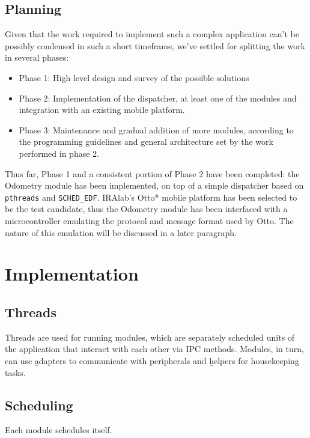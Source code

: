 \documentclass[a4paper,12pt]{report}
\begin{document}
\subsection{Planning}

Given that the work required to implement such a complex application can't be possibly condensed in such a short timeframe, we've settled for splitting the work in several phases:
\begin{itemize}
  \item Phase 1: High level design and survey of the possible solutions
  \item Phase 2: Implementation of the dispatcher, at least one of the modules and integration with an existing mobile platform.
  \item Phase 3: Maintenance and gradual addition of more modules, according to the programming guidelines and general architecture set by the work performed in phase 2.
\end{itemize}

Thus far, Phase 1 and a consistent portion of Phase 2 have been completed: the Odometry module has been implemented, on top of a simple dispatcher based on \texttt{pthreads} and \texttt{SCHED\_EDF}. IRAlab's Otto* mobile platform has been selected to be the test candidate, thus the Odometry module has been interfaced with a microcontroller emulating the protocol and message format used by Otto. The nature of this emulation will be discussed in a later paragraph. %

\section{Implementation}
\subsection{Threads}

Threads are used for running \b{modules}, which are separately scheduled units of the application that interact with each other via IPC methods. Modules, in turn, can use \b{adapters} to communicate with peripherals and \b{helpers} for housekeeping tasks.

\subsection{Scheduling}

Each module schedules itself. 
\end{document}
